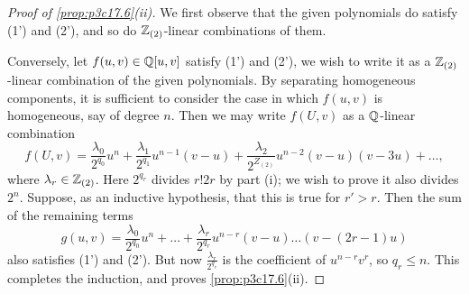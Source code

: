 \documentclass[../main]{subfiles}
\begin{document}
\begin{proof}[Proof of \ref{prop:p3c17.6}(ii)]
We first observe that the given polynomials do satisfy (1') and (2'), and so do $\mathbb{Z}_{(2)}$-linear combinations of them.

Conversely, let $f(u, v) \in \mathbb{Q}[u, v]$ satisfy (1') and (2'), we wish to write it as a $\mathbb{Z}_{(2)}$-linear combination of the given polynomials. By separating homogeneous components, it is sufficient to consider the case in which $f(u, v)$ is homogeneous, say of degree $n$. Then we may write $f(U, v)$ as a $\mathbb{Q}$-linear combination \[f(U, v) = \frac {\lambda_0} {2^{q_0}} u^n + \frac {\lambda_1} {2^{q_1}} u^{n - 1}(v - u) + \frac {\lambda_2} {2^{Z_{(2)}}} u^{n - 2} (v - u) (v - 3u) + \ldots,\] where $\lambda_r \in \mathbb{Z}_{(2)}$. Here $2^{q_r}$ divides $r! 2r$ by part (i); we wish to prove it also divides $2^n$. Suppose, as an inductive hypothesis, that this is true for $r' > r$. Then the sum of the remaining terms \[g(u,v) = \frac {\lambda_0} {2^{q_0}} u^n + \ldots + \frac {\lambda_r} {2^{q_r}} u^{n - r}(v - u) \ldots (v - (2r - 1)u)\] also satisfies (1') and (2'). But now $\displaystyle \frac {\lambda_r} {2^{q_r}}$ is the coefficient of $u^{n - r} v^r$, so $q_r \le n$. This completes the induction, and proves \ref{prop:p3c17.6}(ii).
\end{proof}
\end{document}
